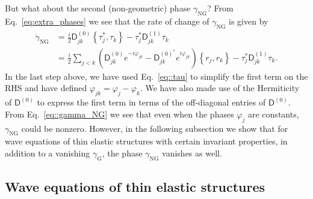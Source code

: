 But what about the second (non-geometric) phase $\gamma_{\text{NG}}$?
From Eq.~\eqref{eq:extra_phases} we see that the rate of change of $\gamma_{\text{NG}}$ is given by
%
\begin{equation}
  \begin{aligned}
  \dot{\gamma}_{\text{NG}} &= \frac{i}{2} \mathsf{D}^{(0)}_{jk}\left\{\tau_{j}^{*}, \tau_{k}\right\} - \tau_{j}^{*}\mathsf{D}^{(1)}_{jk}\tau_{k}\\
                           &= \frac{i}{2}\sum_{j < k} \left(\mathsf{D}^{(0)}_{jk}e^{-i\varphi_{jk}} - \mathsf{D}_{jk}^{(0)^{*}}e^{i\varphi_{jk}}\right)\left\{r_{j},r_{k}\right\} - \tau_{j}^{*}\mathsf{D}^{(1)}_{jk}\tau_{k}.
  \label{eq::gamma_NG}
  \end{aligned}
\end{equation}
%
In the last step above, we have used Eq.~\eqref{eq::tau} to simplify the first term on the RHS and have defined $\varphi_{jk} = \varphi_{j} - \varphi_{k}$.
We have also made use of the Hermiticity of $\mathsf{D}^{(0)}$ to express the first term in terms of the off-diagonal entries of $\mathsf{D}^{(0)}$.
From Eq.~\eqref{eq::gamma_NG} we see that even when the phases $\varphi_{j}$ are constants, $\gamma_{\text{NG}}$ could be nonzero.
However, in the following subsection we show that for wave equations of thin elastic structures with certain invariant properties, in addition to a vanishing $\gamma_{\text{G}}$, the phase $\gamma_{\text{NG}}$ vanishes as well.

\subsection{Wave equations of thin elastic structures}

